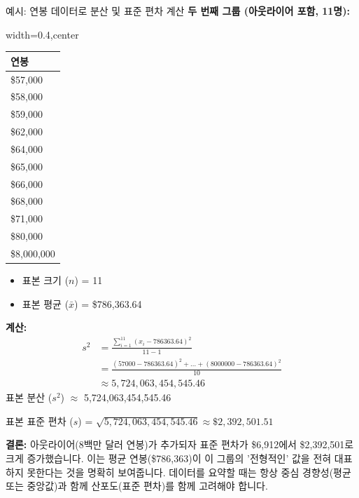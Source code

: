 \documentclass[11pt,a4paper]{article}
\begin{document}
\begin{examplebox}{예시: 연봉 데이터로 분산 및 표준 편차 계산}
\textbf{두 번째 그룹 (아웃라이어 포함, 11명):}
\begin{adjustbox}{width=0.4\textwidth,center}
\begin{tabular}{l}
\toprule
\textbf{연봉} \\
\midrule
\$57,000 \\
\$58,000 \\
\$59,000 \\
\$62,000 \\
\$64,000 \\
\$65,000 \\
\$66,000 \\
\$68,000 \\
\$71,000 \\
\$80,000 \\
\$8,000,000 \\
\bottomrule
\end{tabular}
\end{adjustbox}
\label{tab:salary_example2_sd}
\begin{itemize}
    \item 표본 크기 ($n$) = 11
    \item 표본 평균 ($\bar{x}$) = \$786,363.64
\end{itemize}
\textbf{계산:}
\begin{align*}
    s^2 &= \frac{\sum_{i=1}^{11} (x_i - 786363.64)^2}{11-1} \\
    &= \frac{(57000-786363.64)^2 + \dots + (8000000-786363.64)^2}{10} \\
    &\approx 5,724,063,454,545.46
\end{align*}
표본 분산 ($s^2$) $\approx$ 5,724,063,454,545.46

표본 표준 편차 ($s$) = $\sqrt{5,724,063,454,545.46} \approx \$2,392,501.51$

\textbf{결론:}
아웃라이어(8백만 달러 연봉)가 추가되자 표준 편차가 \$6,912에서 \$2,392,501로 크게 증가했습니다.
이는 평균 연봉(\$786,363)이 이 그룹의 '전형적인' 값을 전혀 대표하지 못한다는 것을 명확히 보여줍니다.
데이터를 요약할 때는 항상 중심 경향성(평균 또는 중앙값)과 함께 산포도(표준 편차)를 함께 고려해야 합니다.
\end{examplebox}
\end{document}

